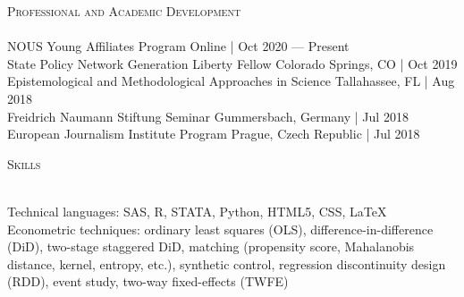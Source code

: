 \documentclass[a4paper,11pt]{article}
\newcommand{\lineunder} {
    \vspace*{-8pt} \\
    \hspace*{-18pt} \hrulefill \\
}
\newcommand{\header} [1] {
    {\hspace*{-18pt}\vspace*{6pt} \textsc{\large{#1}}}
    \vspace*{-6pt} \lineunder
}
\begin{document}
\header{Professional and Academic Development}
\vspace{1mm}
NOUS Young Affiliates Program \hfill Online | Oct 2020 --- Present \\
\vspace{1mm}
State Policy Network Generation Liberty Fellow \hfill Colorado Springs, CO | Oct 2019 \\
\vspace{1mm}
Epistemological and Methodological Approaches in Science \hfill Tallahassee, FL | Aug 2018\\
\vspace{1mm}
Freidrich Naumann Stiftung Seminar \hfill Gummersbach, Germany | Jul 2018\\
\vspace{1mm}
European Journalism Institute Program \hfill Prague, Czech Republic | Jul 2018
\vspace{2mm}

\header{Skills}
\vspace{1mm}

Technical languages: SAS, R, STATA, Python, HTML5, CSS, \LaTeX \\

\vspace{1mm}
Econometric techniques: ordinary least squares (OLS), difference-in-difference (DiD), two-stage staggered DiD, matching (propensity score, Mahalanobis distance, kernel, entropy, etc.), synthetic control, regression discontinuity design (RDD), event study, two-way fixed-effects (TWFE)
\end{document}
